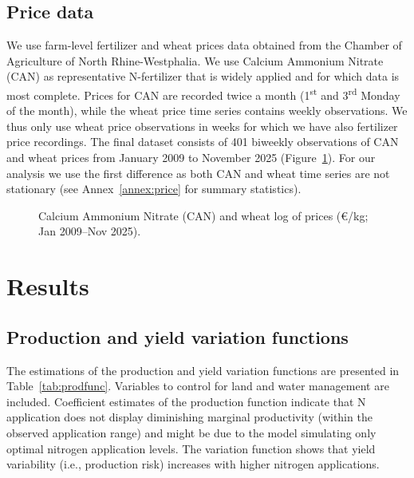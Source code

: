 \documentclass[12pt,a4paper]{article}
\begin{document}
\subsection{Price data}

We use farm-level fertilizer and wheat prices data obtained from the Chamber of Agriculture of North Rhine-Westphalia. We use Calcium Ammonium Nitrate (CAN) as representative N-fertilizer that is widely applied and for which data is most complete. Prices for CAN are recorded twice a month (1\textsuperscript{st} and 3\textsuperscript{rd} Monday of the month), while the wheat price time series contains weekly observations. We thus only use wheat price observations in weeks for which we have also fertilizer price recordings. The final dataset consists of 401 biweekly observations of CAN and wheat prices from January 2009 to November 2025 (Figure~\ref{fig:prices}). For our analysis we use the first difference as both CAN and wheat time series are not stationary (see Annex~\ref{annex:price} for summary statistics).

\begin{figure}[H]
\centering
\caption{Calcium Ammonium Nitrate (CAN) and wheat log of prices (\euro/kg; Jan 2009--Nov 2025).}
\label{fig:prices}
\end{figure}

\section{Results}
\label{sec:results}

\subsection{Production and yield variation functions}

The estimations of the production and yield variation functions are presented in Table~\ref{tab:prodfunc}. Variables to control for land and water management are included. Coefficient estimates of the production function indicate that N application does not display diminishing marginal productivity (within the observed application range) and might be due to the model simulating only optimal nitrogen application levels. The variation function shows that yield variability (i.e., production risk) increases with higher nitrogen applications.
\end{document}
